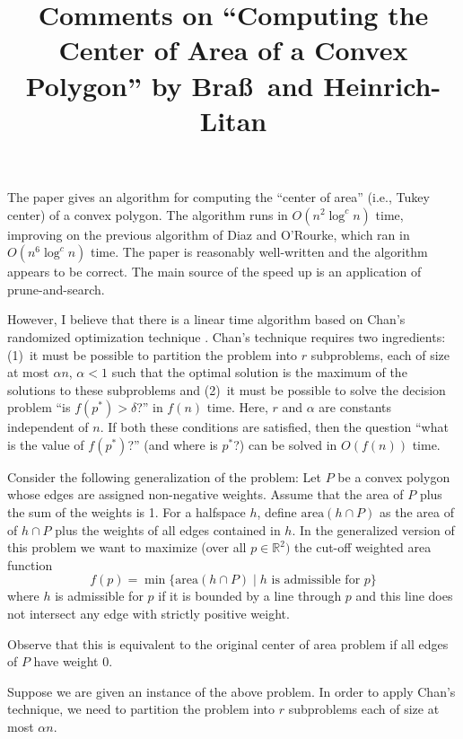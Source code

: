 \documentclass{article}
\title{Comments on ``Computing the Center of Area of a Convex Polygon'' by
Bra\ss\ and Heinrich-Litan}
\date{}
\author{}
\newcommand{\area}{\mathrm{area}}
\begin{document}
\maketitle

The paper gives an algorithm for computing the ``center of area''
(i.e., Tukey center) of a convex polygon.  The algorithm runs in
$O(n^2\log^c n)$ time, improving on the previous algorithm of Diaz and
O'Rourke, which ran in $O(n^6\log^c n)$ time.  The paper is reasonably
well-written and the algorithm appears to be correct.  The main source
of the speed up is an application of prune-and-search.

However, I believe that there is a linear time algorithm based on
Chan's randomized optimization technique \cite{cXX}.  Chan's technique
requires two ingredients: (1)~it must be possible to partition the
problem into $r$ subproblems, each of size at most $\alpha n$,
$\alpha< 1$ such that the optimal solution is the maximum of the
solutions to these subproblems and (2)~it must be possible to solve
the decision problem ``is $f(p^*)>\delta$?'' in $f(n)$ time. Here, $r$
and $\alpha$ are constants independent of $n$.  If both these
conditions are satisfied, then the question ``what is the value of
$f(p^*)$?''  (and where is $p^*$?) can be solved in $O(f(n))$ time.

Consider the following generalization of the problem: Let $P$ be a
convex polygon whose edges are assigned non-negative weights.  Assume
that the area of $P$ plus the sum of the weights is 1.  For a
halfspace $h$, define $\area(h\cap P)$ as the area of of $h\cap P$
plus the weights of all edges contained in $h$.  In the generalized
version of this problem we want to maximize (over all
$p\in\mathbb{R}^2)$ the cut-off weighted area function
\[
	f(p)=\min\{\area(h\cap P)\mid \mbox{$h$ is admissible for $p$}\}
\]
where $h$ is admissible for $p$ if it is bounded by a line through $p$
and this line does not intersect any edge with strictly positive weight.

Observe that this is equivalent to the original center of area problem
if all edges of $P$ have weight 0.

Suppose we are given an instance of the above problem.  In order to apply
Chan's technique, we need to partition the problem into $r$ subproblems
each of size at most $\alpha n$.
\end{document}
